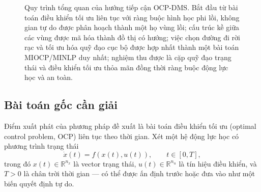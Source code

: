 \begin{figure}[!htp]
\centering
{}
\caption[Quy trình tổng quan OCP-DMS]{Quy trình tổng quan của hướng tiếp cận OCP-DMS. Bắt đầu từ bài toán điều khiển tối ưu liên tục với ràng buộc hình học phi lồi, không gian tự do được phân hoạch thành một họ vùng lồi; cấu trúc kề giữa các vùng được mã hóa thành đồ thị có hướng; việc chọn đường đi rời rạc và tối ưu hóa quỹ đạo cục bộ được hợp nhất thành một bài toán MIOCP/MINLP duy nhất; nghiệm thu được là cặp quỹ đạo trạng thái và điều khiển tối ưu thỏa mãn đồng thời ràng buộc động lực học và an toàn.}
\label{fig:ocp_mms_pipeline}
\end{figure}

\subsection{Bài toán gốc cần giải}
\label{subsec:ocp_original}

Điểm xuất phát của phương pháp đề xuất là bài toán điều khiển tối ưu (optimal control problem, OCP) liên tục theo thời gian. Xét một hệ động lực học có phương trình trạng thái
\begin{equation}
\dot x(t)=f(x(t),u(t)),
\qquad t\in[0,T],
\label{eq:ct_dyn}
\end{equation}
trong đó $x(t)\in\mathbb{R}^{n_x}$ là vector trạng thái, $u(t)\in\mathbb{R}^{n_u}$ là tín hiệu điều khiển, và $T>0$ là chân trời thời gian — có thể được ấn định trước hoặc đưa vào như một biến quyết định tự do.

